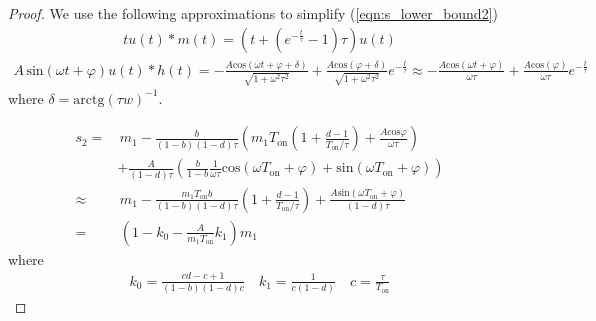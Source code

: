 \begin{proof}

We use the following approximations  to simplify (\ref{eqn:s_lower_bound2})
\begin{align}
    tu(t)*m(t) = \left(t + (e^{-\frac{t}{\tau}}-1)\tau \right) u(t)
\end{align}
\begin{align}
    A \, \text{sin}(\omega  t+\varphi) u(t) * h(t) = -\frac{A \text{cos}(\omega t + \varphi + \delta)}{\sqrt{1+\omega^2\tau^2}} + \frac{A \text{cos}( \varphi + \delta)}{\sqrt{1+\omega^2\tau^2}} e^{-\frac{t}{\tau}} \approx -\frac{A \text{cos}(\omega t + \varphi)}{\omega\tau} + \frac{A \text{cos}( \varphi)}{\omega \tau} e^{-\frac{t}{\tau}}
\end{align}
where $\delta = \text{arctg}(\tau w)^{-1}$.

\begin{align}
    s_2 = & \, m_1 - \frac{b}{(1-b)(1-d)\tau}\left( m_1T_{\text{on}} \left( 1 + \frac{d-1}{T_{\text{on}}/\tau}\right) + \frac{A \text{cos}\varphi}{\omega \tau}\right) \nonumber \\
    & + \frac{A}{(1-d)\tau}\left( \frac{b}{1-b} \frac{1}{\omega \tau} \text{cos}(\omega T_{\text{on}} + \varphi) + \text{sin}(\omega T_{\text{on}}+\varphi)\right) \nonumber \\
    \approx & \, m_1 - \frac{ m_1T_{\text{on}} b }{(1-b)(1-d)\tau} \left( 1 + \frac{d-1}{T_{\text{on}}/\tau}\right) + \frac{A\text{sin}(\omega T_{\text{on}}+\varphi)}{(1-d)\tau} \nonumber \\
    = & \, \left(1- k_0 - \frac{A}{m_1 T_{\text{on}}} k_1 \right)m_1 
\end{align}
where
\begin{align}
    k_0 = \frac{cd-c+1}{(1-b)(1-d)c} \quad k_1 = \frac{1}{c(1-d)} \quad c = \frac{\tau}{T_{\text{on}}}
\end{align}
\end{proof}
